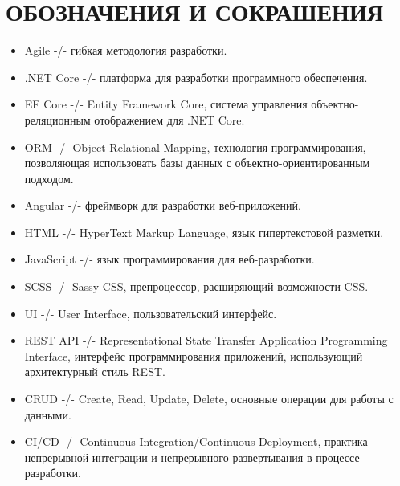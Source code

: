 \section*{ОБОЗНАЧЕНИЯ И СОКРАШЕНИЯ}

\begin{itemize}
    \item Agile -/- гибкая методология разработки.
    \item .NET Core -/- платформа для разработки программного обеспечения.
    \item EF Core -/- Entity Framework Core, система управления объектно-реляционным отображением для .NET Core.
    \item ORM -/- Object-Relational Mapping, технология программирования, позволяющая использовать базы данных с объектно-ориентированным подходом.
    \item Angular -/- фреймворк для разработки веб-приложений.
    \item HTML -/- HyperText Markup Language, язык гипертекстовой разметки.
    \item JavaScript -/- язык программирования для веб-разработки.
    \item SCSS -/- Sassy CSS, препроцессор, расширяющий возможности CSS.
    \item UI -/- User Interface, пользовательский интерфейс.
    \item REST API -/- Representational State Transfer Application Programming Interface, интерфейс программирования приложений, использующий архитектурный стиль REST.
    \item CRUD -/- Create, Read, Update, Delete, основные операции для работы с данными.
    \item CI/CD -/- Continuous Integration/Continuous Deployment, практика непрерывной интеграции и непрерывного развертывания в процессе разработки.
\end{itemize}

